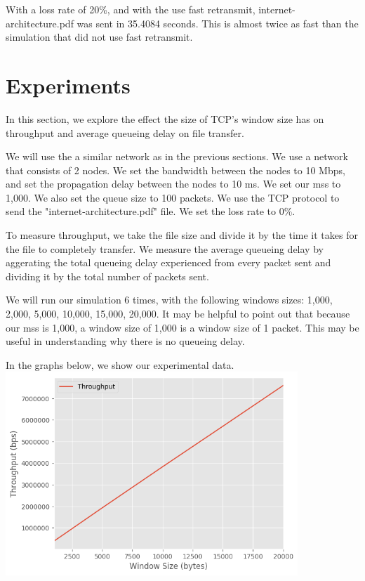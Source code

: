 \documentclass[fleqn,11pt]{article}
\begin{document}
With a loss rate of 20\%,  and with the use fast retransmit, internet-architecture.pdf was sent in 35.4084 seconds. This is almost twice as fast than the simulation that did not use fast retransmit.

\section{Experiments}
In this section, we explore the effect the size of TCP's window size has on throughput and average queueing delay on file transfer. 

We will use the a similar network as in the previous sections. We use a network that consists of 2 nodes. We set the bandwidth between the nodes to 10 Mbps, and set the propagation delay between the nodes to 10 ms. We set our mss to 1,000. We also set the queue size to 100 packets. We use the TCP protocol to send the "internet-architecture.pdf" file. We set the loss rate to 0\%.

To measure throughput, we take the file size and divide it by the time it takes for the file to completely transfer. We measure the average queueing delay by aggerating the total queueing delay experienced from every packet sent and dividing it by the total number of packets sent. 

We will run our simulation 6 times, with the following windows sizes: 1,000, 2,000, 5,000, 10,000, 15,000, 20,000. It may be helpful to point out that because our mss is 1,000, a window size of 1,000 is a window size of 1 packet. This may be useful in understanding why there is no queueing delay.

In the graphs below, we show our experimental data. \\

\includegraphics[width=11cm]{lab2-graph1}\\
\end{document}

